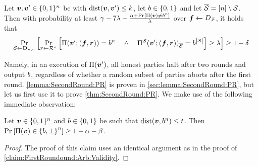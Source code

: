 \begin{lemma}\label{lemma:SecondRound:PR}
Let ${ \boldsymbol{v}},{ \boldsymbol{v}}' \in {\{0,1\}^n}$ be with $\mathrm{dist}({ \boldsymbol{v}},{ \boldsymbol{v}}') \le k$, let  $b\in \{0,1\}$ and let ${\overline{\mathcal{S}}} = [n] \setminus {\cal{S}}$. Then  with probability at least $\gamma- 7\lambda- \frac{\alpha +  \Pr_{}\left[\Pi({ \boldsymbol{v}}) \ne b^n\right]}{\lambda}$ over ${ \boldsymbol{f}} \gets D_{\cal F}$, it holds that
\begin{align*}
\Pr_{{\cal{S}} \gets \mathbf{D}_{n,\sigma}}\left[\Pr_{{ \boldsymbol{r}} \gets \mathcal{R}^n}\left[\Pi({ \boldsymbol{v}}';({ \boldsymbol{f}},{ \boldsymbol{r}})) = b^n \quad \land \quad \Pi^{\cal{S}}({ \boldsymbol{v}}';({ \boldsymbol{f}},{ \boldsymbol{r}}))_{\overline{\mathcal{S}}} = b^{\left|{\overline{\mathcal{S}}}\right|} \right] \ge \lambda\right]\ge 1-\delta
\end{align*}
\end{lemma}
Namely, in an execution of $\Pi({ \boldsymbol{v}}')$, all honest parties halt after two rounds and output $b$, regardless of whether a  random subset of parties  aborts after the first round. \cref{lemma:SecondRound:PR} is proven in \cref{sec:lemma:SecondRound:PR}, but let us first use it to prove \cref{thm:SecondRound:PR}. We make use of the following immediate observation:
\begin{claim}\label{claim:SecondRound:PR:Validity}
Let ${ \boldsymbol{v}} \in {\{0,1\}^n}$  and $b \in \{0,1\}$ be such that $\mathrm{dist}({ \boldsymbol{v}},b^n) \le t$. Then
	$\Pr_{}\left[\Pi({ \boldsymbol{v}}) \in  \left\{b,\perp\right\}^n \right] \ge  1 -   \alpha - \beta $.
\end{claim}
\begin{proof}
The proof of this claim uses an identical argument as in the proof of \cref{claim:FirstRoundound:Arb:Validity}.	
\end{proof}



